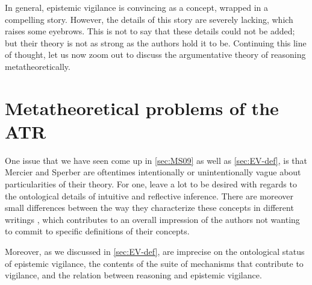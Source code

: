 In general, epistemic vigilance is convincing as a concept, wrapped in a compelling story. However, the details of this story are severely lacking, which raises some eyebrows. This is not to say that these details could not be added; but their theory is not as strong as the authors hold it to be. Continuing this line of thought, let us now zoom out to discuss the argumentative theory of reasoning metatheoretically.

\section{Metatheoretical problems of the ATR}
\label{sec:ont-atr}

One issue that we have seen come up in \cref{sec:MS09} as well as \cref{sec:EV-def}, is that Mercier and Sperber are oftentimes intentionally or unintentionally vague about particularities of their theory.
For one, \citet{MS09} leave a lot to be desired with regards to the ontological details of intuitive and reflective inference.
There are moreover small differences between the way they characterize these concepts in different writings \citep{MS09, MS11}, which contributes to an overall impression of the authors not wanting to commit to specific definitions of their concepts.

Moreover, as we discussed in \cref{sec:EV-def}, \citet{Sperber10} are imprecise on the ontological status of epistemic vigilance, the contents of the suite of mechanisms that contribute to vigilance, and the relation between reasoning and epistemic vigilance.



